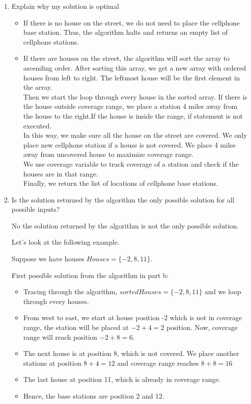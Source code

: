 \documentclass{cpsc413Solutions}
\begin{document}
\begin{problemlist}
\begin{problem}
\begin{answer}
\begin{enumerate}
    \item Explain why my solution is optimal
    \begin{itemize}
        \item If there is no house on the street, we do not need to place the cellphone base station. Thus, the algorithm halts and returns an empty list of cellphone stations.
        \item If there are houses on the street, the algorithm will sort the array to ascending order. After sorting this array, we get a new array with ordered houses from left to right. The leftmost house will be the first element in the array.\\
        Then we start the loop through every house in the sorted array. If there is the house outside coverage range, we place a station 4 miles away from the house to the right.If the house is inside the range, if statement is not executed.\\
        In this way, we make sure all the house on the street are covered. We only place new cellphone station if a house is not covered. We place 4 miles away from uncovered house to maximize coverage range.\\
        We use coverage variable to track coverage of a station and check if the houses are in that range.\\
        Finally, we return the list of locations of cellphone base stations.
    \end{itemize}
    
    \item  Is the solution returned by the algorithm the only possible solution for all possible inputs?
    
    No the solution returned by the algorithm is not the only possible solution.
    
    Let's look at the following example.
    
    Suppose we have houses $Houses = \{-2,8,11\}$.
    
    First possible solution from the algorithm in part b:
    \begin{itemize}
        \item   Tracing through the algorithm, $sortedHouses = \{-2,8,11\}$ and we loop through every houses.
        \item From west to east, we start at house position -2 which is not in coverage range, the station will be placed at $-2+4=2$ position. Now, coverage range will reach position $-2+8=6$.
        \item The next house is at position 8, which is not covered. We place another stations at position $8+4=12$ and coverage range reaches $8+8=16$
        \item The last house at position 11, which is already in coverage range.
        \item Hence, the base stations are position 2 and 12.
    \end{itemize}
    

\end{enumerate}
\end{answer}
\end{problem}
\end{problemlist}
\end{document}
